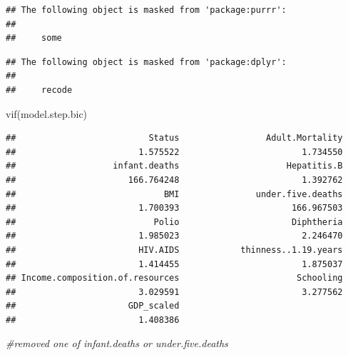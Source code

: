 \documentclass[
]{article}
\newenvironment{Shaded}{\begin{snugshade}}{\end{snugshade}}
\newcommand{\CommentTok}[1]{\textcolor[rgb]{0.56,0.35,0.01}{\textit{#1}}}
\newcommand{\FunctionTok}[1]{\textcolor[rgb]{0.00,0.00,0.00}{#1}}
\newcommand{\NormalTok}[1]{#1}
\begin{document}
\begin{verbatim}
## The following object is masked from 'package:purrr':
## 
##     some
\end{verbatim}

\begin{verbatim}
## The following object is masked from 'package:dplyr':
## 
##     recode
\end{verbatim}

\begin{Shaded}
\begin{Highlighting}[]
\FunctionTok{vif}\NormalTok{(model.step.bic)}
\end{Highlighting}
\end{Shaded}

\begin{verbatim}
##                          Status                 Adult.Mortality 
##                        1.575522                        1.734550 
##                   infant.deaths                     Hepatitis.B 
##                      166.764248                        1.392762 
##                             BMI               under.five.deaths 
##                        1.700393                      166.967503 
##                           Polio                      Diphtheria 
##                        1.985023                        2.246470 
##                        HIV.AIDS            thinness..1.19.years 
##                        1.414455                        1.875037 
## Income.composition.of.resources                       Schooling 
##                        3.029591                        3.277562 
##                      GDP_scaled 
##                        1.408386
\end{verbatim}

\begin{Shaded}
\begin{Highlighting}[]
\CommentTok{\#removed one of infant.deaths or under.five.deaths}
\end{Highlighting}
\end{Shaded}
\end{document}
